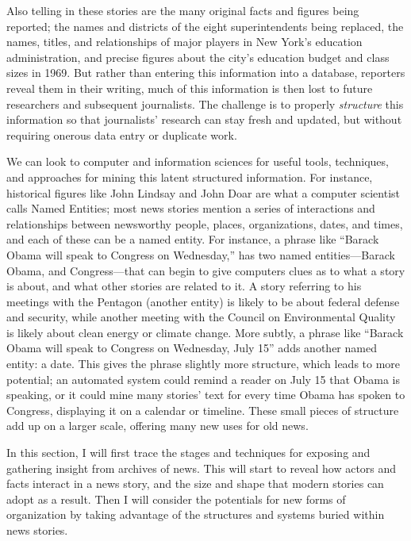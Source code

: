 Also telling in these stories are the many original facts and figures being reported; the names and districts of the eight superintendents being replaced, the names, titles, and relationships of major players in New York's education administration, and precise figures about the city's education budget and class sizes in 1969. But rather than entering this information into a database, reporters reveal them in their writing, much of this information is then lost to future researchers and subsequent journalists. The challenge is to properly \emph{structure} this information so that journalists' research can stay fresh and updated, but without requiring onerous data entry or duplicate work.

We can look to computer and information sciences for useful tools, techniques, and approaches for mining this latent structured information. For instance, historical figures like John Lindsay and John Doar are what a computer scientist calls Named Entities; most news stories mention a series of interactions and relationships between newsworthy people, places, organizations, dates, and times, and each of these can be a named entity. For instance, a phrase like ``Barack Obama will speak to Congress on Wednesday,'' has two named entities---Barack Obama, and Congress---that can begin to give computers clues as to what a story is about, and what other stories are related to it. A story referring to his meetings with the Pentagon (another entity) is likely to be about federal defense and security, while another meeting with the Council on Environmental Quality is likely about clean energy or climate change. More subtly, a phrase like ``Barack Obama will speak to Congress on Wednesday, July 15'' adds another named entity: a date. This gives the phrase slightly more structure, which leads to more potential; an automated system could remind a reader on July 15 that Obama is speaking, or it could mine many stories' text for every time Obama has spoken to Congress, displaying it on a calendar or timeline. These small pieces of structure add up on a larger scale, offering many new uses for old news.


In this section, I will first trace the stages and techniques for exposing and gathering insight from archives of news. This will start to reveal how actors and facts interact in a news story, and the size and shape that modern stories can adopt as a result. Then I will consider the potentials for new forms of organization by taking advantage of the structures and systems buried within news stories.

